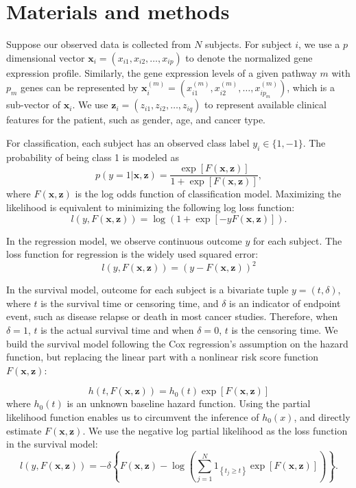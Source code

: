 \documentclass[a4paper,12pt]{article}
\newcommand{\bd}[1]{\mathbf{#1}}
\newcommand{\pathexpr}[3]{{#1}_{#2}^{(#3)}}
\begin{document}
	\section{Materials and methods}\label{methods}
	Suppose our observed data is collected from $N$ subjects. For subject $i$, we use a $p$ dimensional vector $\bd{x}_i = (x_{i1}, x_{i2}, \ldots, x_{ip})$ to denote the normalized gene expression profile. Similarly, the gene expression levels of a given pathway $m$ with $p_m$ genes can be represented by $\pathexpr{\bd{x}}{i}{m} = (\pathexpr{x}{i1}{m},\pathexpr{x}{i2}{m}, \ldots, \pathexpr{x}{ip_m}{m})$, which is a sub-vector of $\bd{x}_i$. We use $\bd{z}_i = (z_{i1}, z_{i2}, \ldots, z_{iq})$ to represent available clinical features for the patient, such as gender, age, and cancer type.
	
	For classification, each subject has an observed class label $y_i \in \{1,-1\}$. The probability of being class 1 is modeled as 
	$$p(y = 1| \bd{x}, \bd{z}) = \frac{\exp[F(\bd{x}, \bd{z})]}{1 + \exp[F(\bd{x}, \bd{z})]},$$
	where $F(\bd{x}, \bd{z})$ is the log odds function of classification model. Maximizing the likelihood is equivalent to minimizing the following log loss function:\cite{zeng2019pathway}
	$$l(y , F(\bd{x}, \bd{z}) ) = \log(1+\exp[-y F(\bd{x}, \bd{z})]).$$
	
	In the regression model, we observe continuous outcome $y$ for each subject. The loss function for regression is the widely used squared error:
	$$l(y , F(\bd{x}, \bd{z}) ) = ( y - F(\bd{x}, \bd{z}))^2$$
	
	In the survival model, outcome for each subject is a bivariate tuple $y = (t, \delta)$, where $t$ is the survival time or censoring time, and $\delta$ is an indicator of endpoint event, such as disease relapse or death in most cancer studies. Therefore, when $\delta = 1$, $t$ is the actual survival time and when $\delta = 0$, $t$ is the censoring time. We build the survival model following the Cox regression's assumption on the hazard function, but replacing the linear part with a nonlinear risk score function $F(\bd{x}, \bd{z})$: \cite{li2005boosting}

	\begin{equation}
	\label{eqn:hazard}
	h(t, F(\bd{x},\bd{z}) ) = h_0(t)\exp[F(\bd{x},\bd{z})]
	\end{equation}
	where $h_0(t)$ is an unknown baseline hazard function. Using the partial likelihood function enables us to circumvent the inference of $h_0(x)$, and directly estimate $F(\bd{x}, \bd{z})$. We use the negative log partial likelihood\cite{li2005boosting} as the loss function in the survival model:
	$$l(y, F(\bd{x}, \bd{z}) ) = -\delta \left\lbrace F(\bd{x}, \bd{z}) - \log\left( \sum^{N}_{j=1}1_{\left\lbrace t_j \geq t\right\rbrace }\exp[F(\bd{x}, \bd{z})]\right)  \right\rbrace.$$
	
\end{document}
